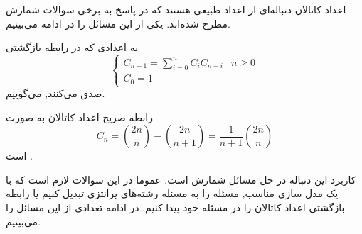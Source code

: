 \p
اعداد کاتالان دنباله‌ای از اعداد طبیعی هستند که در پاسخ به برخی سوالات شمارش مطرح شده‌اند.
یکی از این مسائل را در ادامه می‌بینیم.


\begin{DEFINITION}
    \p
      به اعدادی که در رابطه بازگشتی
    \[\begin{cases}
        C_{n+1}=\sum_{i=0}^n C_iC_{n-i} & n\geq 0 \\
        
        C_0=1
    \end{cases}
    \]
    صدق می‌کنند,
      می‌گوییم.
\end{DEFINITION}


\begin{THEOREM}
    رابطه صریح اعداد کاتالان به صورت
    \[C_n=\binom{2n}{n}-\binom{2n}{n+1}=\dfrac{1}{n+1}\binom{2n}{n}\]
    است
    .
\end{THEOREM}

 کاربرد این دنباله در حل مسائل شمارش است. عموما در این سوالات لازم است که با یک مدل سازی مناسب, مسئله را به مسئله رشته‌های پرانتزی تبدیل کنیم یا رابطه بازگشتی اعداد کاتالان را در مسئله خود پیدا کنیم. در ادامه تعدادی از این مسائل را می‌بینیم.
%
